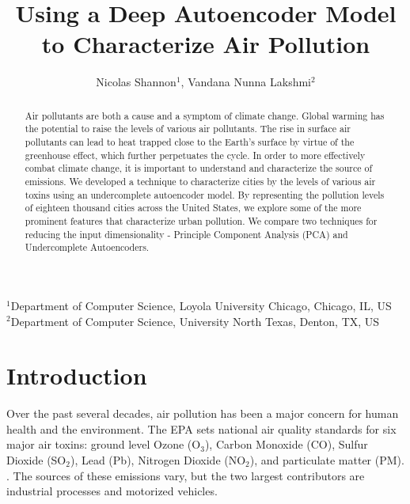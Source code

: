 \documentclass{article}
\title{Using a Deep Autoencoder Model to Characterize Air Pollution}
\author{Nicolas Shannon$^{1}$, Vandana Nunna Lakshmi$^{2}$}
\date{}
\newcommand\note[1]{\textbf{\textcolor{red}{#1}}}
\begin{document}
\begin{centering}
\maketitle
\vspace{-0.50cm}
\scriptsize
{$^{1}$Department of Computer Science, Loyola University Chicago, Chicago, IL, US}\\
{$^{2}$Department of Computer Science, University North Texas, Denton, TX, US}\\
\end{centering}

\begin{abstract}
Air pollutants are both a cause and a symptom of climate change. Global warming has the potential to raise
the levels of various air pollutants. The rise in surface air pollutants can lead to heat trapped close to 
the Earth's surface by virtue of the greenhouse effect, which further perpetuates the cycle. In order to
more effectively combat climate change, it is important to understand and characterize the source of 
emissions. We developed a technique to characterize cities by the levels of various air toxins using an
undercomplete autoencoder model. By representing the pollution levels of eighteen thousand cities across
the United States, we explore some of the more prominent features that characterize urban pollution.
We compare two techniques for reducing the input dimensionality - Principle Component Analysis (PCA) and
Undercomplete Autoencoders.
\end{abstract}

\vspace{0.25cm}
\section{Introduction}
Over the past several decades, air pollution has been a major concern for human health
and the environment. The EPA sets national air quality standards for  six major air
toxins: ground level Ozone (O$_3$), Carbon Monoxide (CO), Sulfur Dioxide (SO$_2$),
Lead (Pb), Nitrogen Dioxide (NO$_2$), and particulate matter (PM). \parencite{NAAQS09}.
The sources of these emissions vary, but the two largest contributors are industrial 
processes and motorized vehicles.

\newpage
\end{document}
